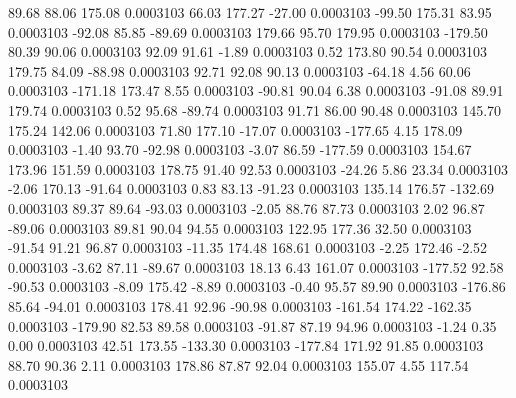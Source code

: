        89.68       88.06      175.08     0.0003103
       66.03      177.27      -27.00     0.0003103
      -99.50      175.31       83.95     0.0003103
      -92.08       85.85      -89.69     0.0003103
      179.66       95.70      179.95     0.0003103
     -179.50       80.39       90.06     0.0003103
       92.09       91.61       -1.89     0.0003103
        0.52      173.80       90.54     0.0003103
      179.75       84.09      -88.98     0.0003103
       92.71       92.08       90.13     0.0003103
      -64.18        4.56       60.06     0.0003103
     -171.18      173.47        8.55     0.0003103
      -90.81       90.04        6.38     0.0003103
      -91.08       89.91      179.74     0.0003103
        0.52       95.68      -89.74     0.0003103
       91.71       86.00       90.48     0.0003103
      145.70      175.24      142.06     0.0003103
       71.80      177.10      -17.07     0.0003103
     -177.65        4.15      178.09     0.0003103
       -1.40       93.70      -92.98     0.0003103
       -3.07       86.59     -177.59     0.0003103
      154.67      173.96      151.59     0.0003103
      178.75       91.40       92.53     0.0003103
      -24.26        5.86       23.34     0.0003103
       -2.06      170.13      -91.64     0.0003103
        0.83       83.13      -91.23     0.0003103
      135.14      176.57     -132.69     0.0003103
       89.37       89.64      -93.03     0.0003103
       -2.05       88.76       87.73     0.0003103
        2.02       96.87      -89.06     0.0003103
       89.81       90.04       94.55     0.0003103
      122.95      177.36       32.50     0.0003103
      -91.54       91.21       96.87     0.0003103
      -11.35      174.48      168.61     0.0003103
       -2.25      172.46       -2.52     0.0003103
       -3.62       87.11      -89.67     0.0003103
       18.13        6.43      161.07     0.0003103
     -177.52       92.58      -90.53     0.0003103
       -8.09      175.42       -8.89     0.0003103
       -0.40       95.57       89.90     0.0003103
     -176.86       85.64      -94.01     0.0003103
      178.41       92.96      -90.98     0.0003103
     -161.54      174.22     -162.35     0.0003103
     -179.90       82.53       89.58     0.0003103
      -91.87       87.19       94.96     0.0003103
       -1.24        0.35        0.00     0.0003103
       42.51      173.55     -133.30     0.0003103
     -177.84      171.92       91.85     0.0003103
       88.70       90.36        2.11     0.0003103
      178.86       87.87       92.04     0.0003103
      155.07        4.55      117.54     0.0003103
